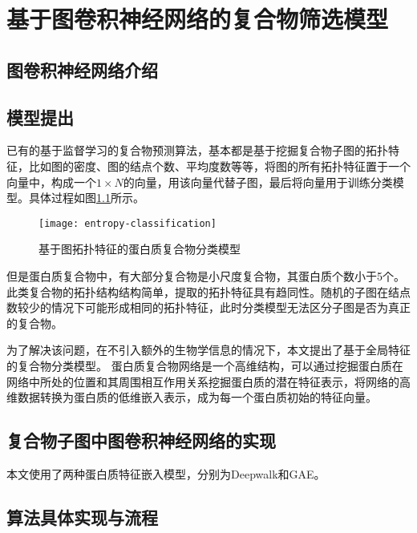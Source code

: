 \chapter{基于图卷积神经网络的复合物筛选模型}
\label{chapter:NodeConv}

\section{图卷积神经网络介绍}
\label{section:NodeConv:intro}



\section{模型提出}
\label{section:NodeConv:Put}

已有的基于监督学习的复合物预测算法，基本都是基于挖掘复合物子图的拓扑特征，比如图的密度、图的结点个数、平均度数等等，将图的所有拓扑特征置于一个向量中，构成一个$1\times N$的向量，用该向量代替子图，最后将向量用于训练分类模型。具体过程如图\ref{fig:entropy-classification}所示。

\begin{figure}[htbp]
    \centering
    \texttt{[image: entropy-classification]}
    \caption{基于图拓扑特征的蛋白质复合物分类模型}
    \label{fig:entropy-classification}
\end{figure}


但是蛋白质复合物中，有大部分复合物是小尺度复合物，其蛋白质个数小于5个。此类复合物的拓扑结构结构简单，提取的拓扑特征具有趋同性。随机的子图在结点数较少的情况下可能形成相同的拓扑特征，此时分类模型无法区分子图是否为真正的复合物。

为了解决该问题，在不引入额外的生物学信息的情况下，本文提出了基于全局特征的复合物分类模型。
蛋白质复合物网络是一个高维结构，可以通过挖掘蛋白质在网络中所处的位置和其周围相互作用关系挖掘蛋白质的潜在特征表示，将网络的高维数据转换为蛋白质的低维嵌入表示，成为每一个蛋白质初始的特征向量。

\section{复合物子图中图卷积神经网络的实现}
\label{section:NodeConv:detail}

本文使用了两种蛋白质特征嵌入模型，分别为Deepwalk和GAE。





\section{算法具体实现与流程}
\label{section:NodeConv:flow}

